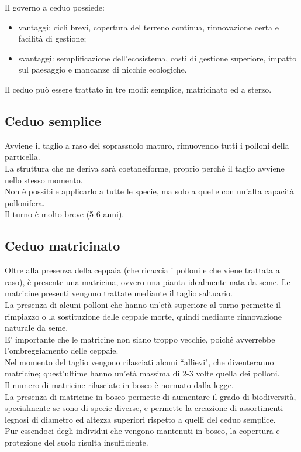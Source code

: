 \documentclass{article}
\begin{document}
Il governo a ceduo possiede:
\begin{itemize}
    \item vantaggi: cicli brevi, copertura del terreno continua, rinnovazione certa e facilità di gestione;
    \item svantaggi: semplificazione dell'ecosistema, costi di gestione superiore, impatto sul paesaggio e mancanze di nicchie ecologiche.
\end{itemize}
Il ceduo può essere trattato in tre modi: semplice, matricinato ed a sterzo.

\subsection{Ceduo semplice}
Avviene il taglio a raso del soprassuolo maturo, rimuovendo tutti i polloni della particella.\\
La struttura che ne deriva sarà coetaneiforme, proprio perché il taglio avviene nello stesso momento.\\
Non è possibile applicarlo a tutte le specie, ma solo a quelle con un'alta capacità pollonifera.\\
Il turno è molto breve (5-6 anni).
\subsection{Ceduo matricinato}
Oltre alla presenza della ceppaia (che ricaccia i polloni e che viene trattata a raso), è presente una matricina, ovvero una pianta idealmente nata da seme. Le matricine presenti vengono trattate mediante il taglio saltuario.\\
La presenza di alcuni polloni che hanno un'età superiore al turno permette il rimpiazzo o la sostituzione delle ceppaie morte, quindi mediante rinnovazione naturale da seme.\\
E' importante che le matricine non siano troppo vecchie, poiché avverrebbe l'ombreggiamento delle ceppaie.\\
Nel momento del taglio vengono rilasciati alcuni ``allievi", che diventeranno matricine; quest'ultime hanno un'età massima di 2-3 volte quella dei polloni. \\
Il numero di matricine rilasciate in bosco è normato dalla legge.\\
La presenza di matricine in bosco permette di aumentare il grado di biodiversità, specialmente se sono di specie diverse, e permette la creazione di assortimenti legnosi di diametro ed altezza superiori rispetto a quelli del ceduo semplice.\\
Pur essendoci degli individui che vengono mantenuti in bosco, la copertura e protezione del suolo risulta insufficiente.
\end{document}
